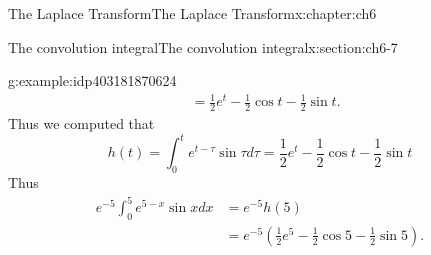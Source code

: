 \documentclass[oneside,10pt,]{book}
\numberwithin{equation}{section}
\numberwithin{equation}{section}
\newcommand{\amp}{&}
\begin{document}
\begin{chapterptx}{The Laplace Transform}{}{The Laplace Transform}{}{}{x:chapter:ch6}
\begin{sectionptx}{The convolution integral}{}{The convolution integral}{}{}{x:section:ch6-7}
\begin{example}{}{g:example:idp403181870624}
\begin{align*}
\amp =\frac{1}{2}e^{t}-\frac{1}{2}\cos t-\frac{1}{2}\sin t.
\end{align*}
Thus we computed that%
\begin{equation*}
h(t)=\int_{0}^{t}e^{t-\tau}\sin\tau d\tau=\frac{1}{2}e^{t}-\frac{1}{2}\cos t-\frac{1}{2}\sin t
\end{equation*}
Thus%
\begin{align*}
e^{-5}\int_{0}^{5}e^{5-x}\sin xdx \amp =e^{-5}h(5)\\
\amp =e^{-5}\left(\frac{1}{2}e^{5}-\frac{1}{2}\cos5-\frac{1}{2}\sin5\right).
\end{align*}
%
\end{example}
\end{sectionptx}
\end{chapterptx}
%
%
%
%
\typeout{************************************************}
\typeout{************************************************}
%
%
\appendix
%
\end{document}
